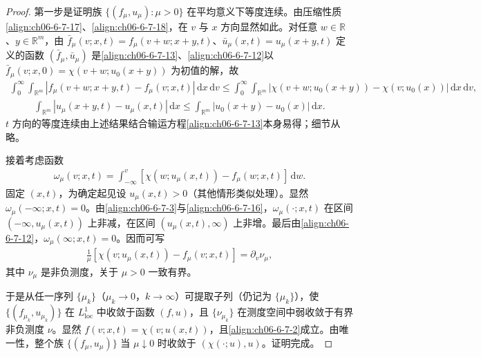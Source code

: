 \documentclass[../../main.tex]{subfiles}
\begin{document}
\begin{proof}
第一步是证明族 $\{(f_{\mu},u_{\mu}):\mu>0\}$ 在平均意义下等度连续。由压缩性质\eqref{align:ch06-6-7-17}、\eqref{align:ch06-6-7-18}，在 $v$ 与 $x$ 方向显然如此。对任意 $w\in\mathbb{R}$、$y\in\mathbb{R}^{m}$，由 $\bar{f}_{\mu}(v;x,t)=f_{\mu}(v+w;x+y,t)$、$\bar{u}_{\mu}(x,t)=u_{\mu}(x+y,t)$ 定义的函数 $(\bar{f}_{\mu},\bar{u}_{\mu})$ 是\eqref{align:ch06-6-7-13}、\eqref{align:ch06-6-7-12}以 $\bar{f}_{\mu}(v;x,0)=\chi(v+w;u_{0}(x+y))$ 为初值的解，故
\begin{align}
\int_{0}^{\infty}\int_{\mathbb{R}^{m}}|f_{\mu}(v+w;x+y,t)-f_{\mu}(v;x,t)|\,\mathrm{d}x\,\mathrm{d}v
\leqslant\int_{0}^{\infty}\int_{\mathbb{R}^{m}}|\chi(v+w;u_{0}(x+y))-\chi(v;u_{0}(x))|\,\mathrm{d}x\,\mathrm{d}v,
\label{align:ch06-6-7-28}
\end{align}
\begin{align}
\int_{\mathbb{R}^{m}}|u_{\mu}(x+y,t)-u_{\mu}(x,t)|\,\mathrm{d}x\leqslant\int_{\mathbb{R}^{m}}|u_{0}(x+y)-u_{0}(x)|\,\mathrm{d}x.
\label{align:ch06-6-7-29}
\end{align}
$t$ 方向的等度连续由上述结果结合输运方程\eqref{align:ch06-6-7-13}本身易得；细节从略。

接着考虑函数
\begin{align}
\omega_{\mu}(v;x,t)=\int_{-\infty}^{v}[\chi(w;u_{\mu}(x,t))-f_{\mu}(w;x,t)]\,\mathrm{d}w.
\label{align:ch06-6-7-30}
\end{align}
固定 $(x,t)$，为确定起见设 $u_{\mu}(x,t)>0$（其他情形类似处理）。显然 $\omega_{\mu}(-\infty;x,t)=0$。由\eqref{align:ch06-6-7-3}与\eqref{align:ch06-6-7-16}，$\omega_{\mu}(\cdot;x,t)$ 在区间 $(-\infty,u_{\mu}(x,t))$ 上非减，在区间 $(u_{\mu}(x,t),\infty)$ 上非增。最后由\eqref{align:ch06-6-7-12}，$\omega_{\mu}(\infty;x,t)=0$。因而可写
\begin{align}
\frac{1}{\mu}[\chi(v;u_{\mu}(x,t))-f_{\mu}(v;x,t)]=\partial_{v}\nu_{\mu},
\label{align:ch06-6-7-31}
\end{align}
其中 $\nu_{\mu}$ 是非负测度，关于 $\mu>0$ 一致有界。

于是从任一序列 $\{\mu_{k}\}$（$\mu_{k}\to 0$，$k\to\infty$）可提取子列（仍记为 $\{\mu_{k}\}$），使 $\{(f_{\mu_{k}},u_{\mu_{k}})\}$ 在 $L^{1}_{\mathrm{loc}}$ 中收敛于函数 $(f,u)$，且 $\{\nu_{\mu_{k}}\}$ 在测度空间中弱收敛于有界非负测度 $\nu$。显然 $f(v;x,t)=\chi(v;u(x,t))$，且\eqref{align:ch06-6-7-2}成立。由唯一性，整个族 $\{(f_{\mu},u_{\mu})\}$ 当 $\mu\downarrow 0$ 时收敛于 $(\chi(\cdot;u),u)$。证明完成。
\end{proof}
\end{document}
